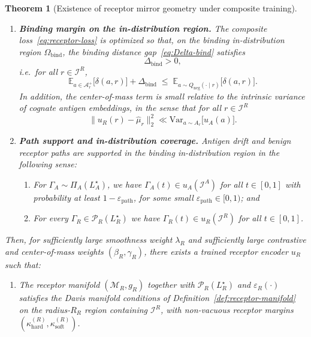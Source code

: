 \documentclass[11pt]{article}
\newcommand{\Ical}{\mathcal{I}}
\newcommand{\M}{\mathcal{M}}
\newcommand{\Pcal}{\mathcal{P}}
\newcommand{\Acal}{\mathcal{A}}
\newcommand{\E}{\mathbb{E}}
\newcommand{\Var}{\mathrm{Var}}
\newtheorem{theorem}{Theorem}
\begin{document}
\begin{theorem}[Existence of receptor mirror geometry under composite training]
\begin{enumerate}
  \item[\textnormal{(3)}] \textbf{Binding margin on the in-distribution region.}
    The composite loss~\eqref{eq:receptor-loss} is optimized so that, on the
    binding in-distribution region $\Omega_{\mathrm{bind}}$, the binding
    distance gap~\eqref{eq:Delta-bind} satisfies
    \[
      \Delta_{\mathrm{bind}} > 0,
    \]
    i.e.\ for all $r \in \Ical^R$,
    \begin{equation}
      \E_{a \in \Acal_r^+}\bigl[ \delta(a,r) \bigr]
        + \Delta_{\mathrm{bind}}
      \;\le\;
      \E_{a \sim Q_{\mathrm{neg}}(\cdot\mid r)}
        \bigl[ \delta(a,r) \bigr].
      \label{eq:positive-margin}
    \end{equation}
    In addition, the center-of-mass term is small relative to the intrinsic
    variance of cognate antigen embeddings, in the sense that for all
    $r \in \Ical^R$
    \[
      \bigl\| u_R(r) - \hat{\mu}_r \bigr\|_2^2
        \ll \Var_{a \sim A_r}\bigl[ u_A(a) \bigr].
    \]

  \item[\textnormal{(4)}] \textbf{Path support and in-distribution coverage.}
    Antigen drift and benign receptor paths are supported in the binding
    in-distribution region in the following sense:
    \begin{enumerate}
      \item[(a)] For $\Gamma_A \sim \Pi_A(L_A^\star)$, we have
        $\Gamma_A(t) \in u_A(\Ical^A)$ for all $t \in [0,1]$ with probability
        at least $1 - \varepsilon_{\mathrm{path}}$, for some small
        $\varepsilon_{\mathrm{path}} \in [0,1)$; and
      \item[(b)] For every $\Gamma_R \in \Pcal_R(L_R^\star)$ we have
        $\Gamma_R(t) \in u_R(\Ical^R)$ for all $t \in [0,1]$.
    \end{enumerate}
\end{enumerate}

Then, for sufficiently large smoothness weight $\lambda_R$ and sufficiently
large contrastive and center-of-mass weights $(\beta_R,\gamma_R)$, there exists
a trained receptor encoder $u_R$ such that:

\begin{enumerate}
  \item[\textnormal{(i)}] The receptor manifold $(\M_R,g_R)$ together with
    $\Pcal_R(L_R^\star)$ and $\varepsilon_R(\cdot)$ satisfies the Davis
    manifold conditions of Definition~\ref{def:receptor-manifold} on the
    radius-$R_R$ region containing $\Ical^R$, with non-vacuous receptor
    margins $(\kappa_{\mathrm{hard}}^{(R)},\kappa_{\mathrm{soft}}^{(R)})$.


\end{enumerate}
\end{theorem}
\end{document}
